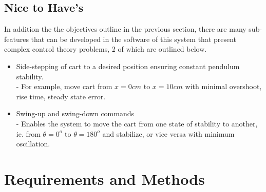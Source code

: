 \documentclass[12pt]{article}
\begin{document}
\subsection{Nice to Have's}
\label{nice}
In addition the the objectives outline in the previous section, there are many sub-features that can be developed in the software of this system that present complex control theory problems, 2 of which are outlined below.
\begin{itemize}
    \item Side-stepping of cart to a desired position ensuring constant pendulum stability.\\ \indent - For example, move cart from $x=0cm$ to $x=10cm$ with minimal overshoot, rise time, steady state error.
    \item Swing-up and swing-down commands\\ \indent - Enables the system to move the cart from one state of stability to another, ie. from $\theta =0^o$ to $\theta =180^o$ and stabilize, or vice versa with minimum oscillation.
\end{itemize}
\section{Requirements and Methods}
\end{document}
